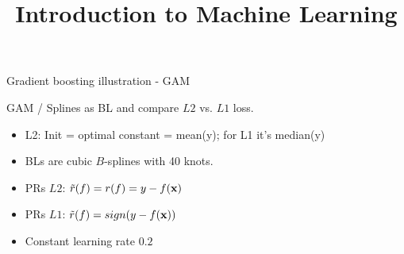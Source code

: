 \documentclass[11pt,compress,t,notes=noshow, xcolor=table]{beamer}
\title{Introduction to Machine Learning}
\date{}
\begin{document}


\begin{vbframe}{Gradient boosting illustration - GAM}

GAM / Splines as BL and compare $L2$ vs. $L1$ loss.
\vspace*{0.2cm}

\begin{itemize}
  \item L2: Init = optimal constant = mean(y);
      for L1 it's median(y)
    \item BLs are cubic $B$-splines with 40 knots.
\item PRs $L2$: $\tilde{r}(f) = r(f) = y - f(\mathbf{x})$
\item PRs $L1$: $\tilde{r}(f) = sign(y - f(\mathbf{x}))$
    \item Constant learning rate $0.2$ 
\end{itemize}


\end{vbframe}
\end{document}
